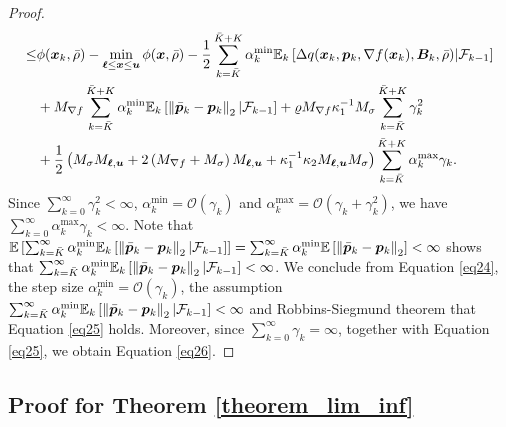 \documentclass[aos]{imsart}
\numberwithin{equation}{section}
\theoremstyle{plain}
\begin{document}
\begin{appendix}
\begin{proof}
\begin{equation}
\begin{split}
            \leq & \phi(\bm{x}_{k},\Bar{\rho}) - \min_{\bm{\ell} \leq \bm{x} \leq \bm{u}}\phi(\bm{x},\Bar{\rho}) -\frac{1}{2} \sum_{k=\Bar{K}}^{\Bar{K} + K} \alpha_k^{\text{min}} \mathbb{E}_k \left[ \Delta q(\bm{x}_k,\bm{p}_k,\nabla f(\bm{x}_k),\bm{B}_k,\Bar{\rho}) | \mathcal{F}_{k-1} \right] \\
            &  + M_{\nabla f} \sum_{k=\Bar{K}}^{\Bar{K} + K} \alpha_k^{\text{min}} \mathbb{E}_k \left[ \left\|\Bar{\bm{p}}_k - \bm{p}_k \right\|_2 | \mathcal{F}_{k-1} \right] + \varrho M_{\nabla f} \kappa_1^{-1} M_{\sigma} \sum_{k=\Bar{K}}^{\Bar{K} + K} \gamma_k^2 \\
            &  + \frac{1}{2} \left( M_{\sigma} M_{\bm{\ell},\bm{u}} + 2 \left(M_{\nabla f} + M_{\sigma} \right)  M_{\bm{\ell},\bm{u}} + \kappa_1^{-1} \kappa_2 M_{\bm{\ell},\bm{u}} M_{\sigma} \right) \sum_{k=\Bar{K}}^{\Bar{K} + K}  \alpha_k^{\text{max}} \gamma_k.
      \end{split}
    \end{equation} 
    Since $\sum_{k=0}^{\infty} \gamma_k^2 < \infty$, $\alpha_k^{\text{min}} = \mathcal{O}\left( \gamma_k \right)$ and  $\alpha_k^{\text{max}} = \mathcal{O}\left( \gamma_k + \gamma_k^2 \right)$, we have $\sum_{k=0}^{\infty} \alpha_k^{\text{max}} \gamma_k < \infty$. Note that $\mathbb{E} \left[\sum_{k=\Bar{K}}^{\infty} \alpha_k^{\text{min}} \mathbb{E}_k \left[\left\|\Bar{\bm{p}}_k - \bm{p}_k \right\|_2| \mathcal{F}_{k-1} \right]\right] = \sum_{k=\Bar{K}}^{\infty} \alpha_k^{\text{min}} \mathbb{E} \left[\left\|\Bar{\bm{p}}_k - \bm{p}_k \right\|_2\right] < \infty$ shows that $\sum_{k=\Bar{K}}^{\infty} \alpha_k^{\text{min}} \mathbb{E}_k \left[\left\|\Bar{\bm{p}}_k - \bm{p}_k \right\|_2| \mathcal{F}_{k-1} \right] < \infty$. We conclude from Equation \eqref{eq24}, the step size $\alpha_k^{\text{min}} = \mathcal{O}\left( \gamma_k \right)$, the assumption $\sum_{k=\Bar{K}}^{\infty} \alpha_k^{\text{min}} \mathbb{E}_k \left[\left\|\Bar{\bm{p}}_k - \bm{p}_k \right\|_2| \mathcal{F}_{k-1} \right] < \infty$ and Robbins-Siegmund theorem \cite{robbins1971convergence} that Equation \eqref{eq25} holds. Moreover, since $\sum_{k=0}^{\infty} \gamma_k = \infty$, together with Equation \eqref{eq25}, we obtain Equation \eqref{eq26}.
\end{proof}


\subsection{Proof for Theorem \ref{theorem_lim_inf}}


\end{appendix}
\end{document}
